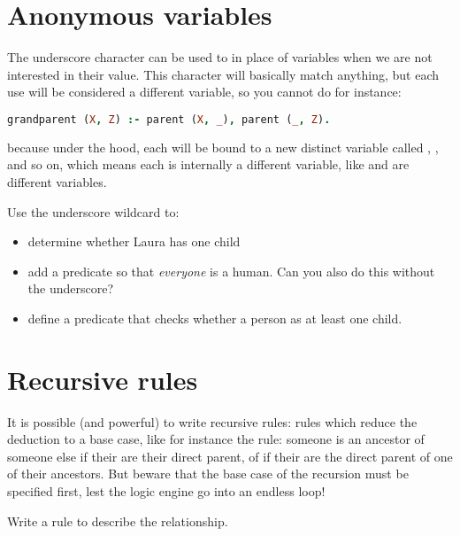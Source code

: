 \documentclass{../../../tp}
\begin{document}
\section{Anonymous variables}

The underscore character can be used to in place of variables when we are not interested in their value. This character will basically match anything, but each use will be considered a different variable, so you cannot do for instance:

\begin{lstlisting}[language=prolog]
grandparent (X, Z) :- parent (X, _), parent (_, Z).
\end{lstlisting}

because under the hood, each \prologcode{_} will be bound to a new distinct variable called , ,  and so on, which means each \prologcode{_} is internally a different variable, like  and  are different variables.

\begin{instruction}
	Use the underscore wildcard to:
	\begin{itemize}
		\item determine whether Laura has one child
		\item add a  predicate so that \emph{everyone} is a human. Can you also do this without the underscore?
		\item define a  predicate that checks whether a person as at least one child. 
	\end{itemize}
\end{instruction} 


\section{Recursive rules}

It is possible (and powerful) to write recursive rules: rules which reduce the deduction to a base case, like for instance the  rule: someone is an ancestor of someone else if their are their direct parent, of if their are the direct parent of one of their ancestors. But beware that the base case of the recursion must be specified first, lest the logic engine go into an endless loop!

\begin{instruction}
	Write a rule to describe the  relationship.
\end{instruction}
\end{document}
